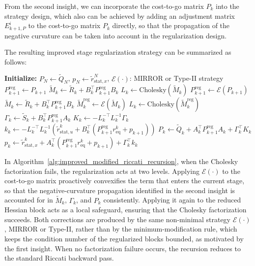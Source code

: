 \documentclass[class=scrbook, crop=false]{standalone}
\begin{document}
From the second insight, we can incorporate the cost-to-go matrix $P_k$ into the strategy design,
which also can be achieved by adding an adjustment matrix $E_{k+1,P}^i$ to the cost-to-go matrix $P_k$ directly,
so that the propagation of the negative curvature can be taken into account in the regularization design.

The resulting improved stage regularization strategy can be summarized as follows:

\begin{algorithm}[H]
\caption{Backward Pass of Improved Modified Riccati Recursion}
\label{alg:improved_modified_riccati_recursion}
\begin{algorithmic}[1]
\State\textbf{Initialize:} $P_N \gets \tilde{Q}_N$, $p_N \gets \tilde{r}_{\mathrm{stat}, x}^N$, $\mathcal{E}(\cdot)$: MIRROR or Type-II strategy
\Statex 
{}
    \State $P_{k+1}^\mathrm{reg} \gets P_{k+1}$ 
    \State $\tilde{M}_k \gets \tilde{R}_k + B_k^\top P_{k+1}^\mathrm{reg} B_k$
    \State $L_k \gets \mathrm{Cholesky}(\tilde{M}_k)$
        \State $P_{k+1}^\mathrm{reg} \gets \mathcal{E}(P_{k+1})$ 
        \State $\tilde{M}_k \gets \tilde{R}_k + B_k^\top P_{k+1}^\mathrm{reg} B_k$
        \State $\tilde{M}_k^\mathrm{reg} \gets \mathcal{E}(\tilde{M}_k)$ 
        \State $L_k \gets \mathrm{Cholesky}(\tilde{M}_k^\mathrm{reg})$
    \EndIf
    \State $\Gamma_k \gets \tilde{S}_k + B_k^\top P_{k+1}^\mathrm{reg} A_k$
    \Statex
    \State $K_k \gets -L_k^{-\top} L_k^{-1} \Gamma_k$
    \State $k_k \gets -L_k^{-\top} L_k^{-1} \left(\tilde{r}_{\mathrm{stat}, u}^k + B_k^\top (P_{k+1}^\mathrm{reg} r_{\mathrm{eq}}^k + p_{k+1})\right)$
    \Statex
    \State $P_k \gets \tilde{Q}_k + A_k^\top P_{k+1}^\mathrm{reg} A_k + \Gamma_k^\top K_k$
    \State $p_k \gets \tilde{r}_{\mathrm{stat}, x}^k + A_k^\top (P_{k+1}^\mathrm{reg} r_{\mathrm{eq}}^k + p_{k+1}) + \Gamma_k^\top k_k$
\EndFor
\end{algorithmic}
\end{algorithm}

In Algorithm~\ref{alg:improved_modified_riccati_recursion}, when the Cholesky factorization fails, the regularization acts at two levels. 
Applying $\mathcal{E}(\cdot)$ to the cost-to-go matrix proactively convexifies the term that enters the current stage, 
so that the negative-curvature propagation identified in the second insight is accounted for in $\tilde{M}_k$, $\Gamma_k$, and $P_k$ consistently. 
Applying it again to the reduced Hessian block acts as a local safeguard, ensuring that the Cholesky factorization succeeds.
Both corrections are produced by the same non-minimal strategy $\mathcal{E}(\cdot)$, MIRROR or Type-II, rather than by the minimum-modification rule, 
which keeps the condition number of the regularized blocks bounded, as motivated by the first insight. 
When no factorization failure occurs, the recursion reduces to the standard Riccati backward pass.
\end{document}
